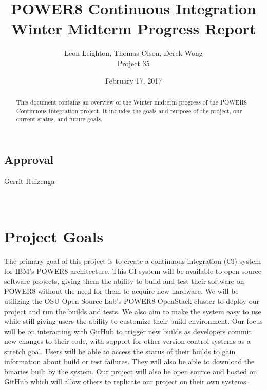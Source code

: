 \documentclass[10pt,onecolumn,journal,draftclsnofoot]{IEEEtran}
\begin{document}
\begin{titlepage}
  \title{POWER8 Continuous Integration\\ Winter Midterm Progress Report}
  \author{Leon Leighton, Thomas Olson, Derek Wong\\Project 35}
  \date{February 17, 2017}
  \maketitle
  \vspace{4cm}
  \begin{abstract}
  \noindent This document contains an overview of the Winter midterm progress of the POWER8 Continuous Integration project.
    It includes the goals and purpose of the project, our current status, and future goals.
 \end{abstract}
    \bigskip
    \bigskip
    \bigskip
    \bigskip
    \bigskip

 \section*{Approval}
    \bigskip
    \bigskip
    \bigskip
\noindent Gerrit Huizenga\hspace{0.7cm} \makebox[1.5in]{\hrulefill}\\\\\\

\end{titlepage}

\tableofcontents
\clearpage

\section{Project Goals}
The primary goal of this project is to create a continuous integration (CI) system for IBM's POWER8 architecture.
This CI system will be available to open source software projects, giving them the ability to build and test their software on POWER8 without the need for them to acquire new hardware.
We will be utilizing the OSU Open Source Lab's POWER8 OpenStack cluster to deploy our project and run the builds and tests.
We also aim to make the system easy to use while still giving users the ability to customize their build environment.
Our focus will be on interacting with GitHub to trigger new builds as developers commit new changes to their code, with support for other version control systems as a stretch goal.
Users will be able to access the status of their builds to gain information about build or test failures.
They will also be able to download the binaries built by the system.
Our project will also be open source and hosted on GitHub which will allow others to replicate our project on their own systems.
\end{document}
